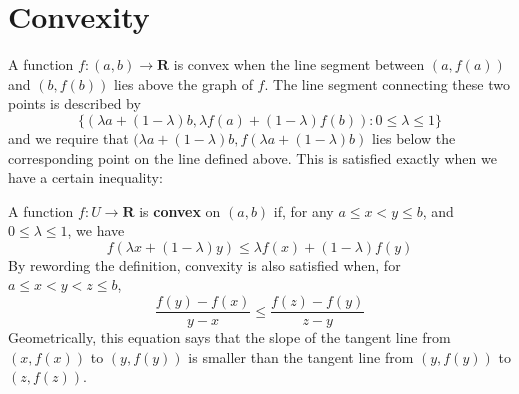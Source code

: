\section{Convexity}

A function $f:(a,b) \to \mathbf{R}$ is convex when the line segment between $(a,f(a))$ and $(b,f(b))$ lies above the graph of $f$. The line segment connecting these two points is described by
%
\[ \{ (\lambda a + (1 - \lambda) b, \lambda f(a) + (1 - \lambda) f(b)) : 0 \leq \lambda \leq 1 \} \]
%
and we require that $(\lambda a + (1 - \lambda)b, f(\lambda a + (1 - \lambda)b)$ lies below the corresponding point on the line defined above. This is satisfied exactly when we have a certain inequality:

\begin{definition}
    A function $f:U \to \mathbf{R}$ is {\bf convex} on $(a,b)$ if, for any $a \leq x < y \leq b$, and $0 \leq \lambda \leq 1$, we have
    \begin{equation} \label{convex1} f(\lambda x + (1 - \lambda) y) \leq \lambda f(x) + (1 - \lambda) f(y) \end{equation}
    By rewording the definition, convexity is also satisfied when, for $a \leq x < y < z \leq b$,
    \begin{equation} \label{convex2} \frac{f(y) - f(x)}{y - x} \leq \frac{f(z) - f(y)}{z - y} \end{equation}
    Geometrically, this equation says that the slope of the tangent line from $(x, f(x))$ to $(y, f(y))$ is smaller than the tangent line from $(y, f(y))$ to $(z, f(z))$.
\end{definition}

